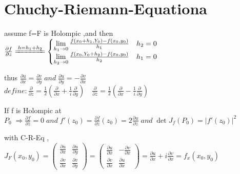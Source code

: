 \documentclass[12pt, a4paper, oneside]{ctexart}
\begin{document}
\section*{Chuchy-Riemann-Equationa}
assume f=F is Holompic ,and then $\frac{\partial{f}}{\partial{z}}\xlongequal{h=h_1+h_2}
\begin{cases}
    \lim\limits_{h_1\to 0}\frac{f(x_0+h_1,Y_0)-f(x_0,y_0)}{h_1}&h_2=0\\
    \lim\limits_{h_2\to 0}\frac{f(x_0,Y_0+h_2)-f(x_0,y_0)}{h_2}&h_1=0    
\end{cases}$\\
\begin{center}  
thus $\frac{\partial{u}}{\partial{x}}=\frac{\partial{v}}{\partial{y}}\;and\;
    \frac{\partial{u}}{\partial{y}}=-\frac{\partial{v}}{\partial{x}}$\\
    $define:\frac{\partial}{\partial{z}}=\frac{1}{2}(\frac{\partial}{\partial{x}}+\frac{1}{i}\frac{\partial}{\partial{y}})
    \quad\frac{\partial}{\partial{\overline{z}}}=\frac{1}{2}(\frac{\partial}{\partial{x}}-\frac{1}{i}\frac{\partial}{\partial{y}})$
\end{center}
\begin{center}
    If f is Holompic at $P_0\;\Rightarrow \frac{\partial{f}}{\partial{\overline{z}}}=0\;and\;f'(z_0)=\frac{\partial{f}}{\partial{z}}(z_0)=
    2\frac{\partial{u}}{\partial{z}}\;and\;\det{J_f(P_0)}=|f'(z_0)|^2$
\end{center}
\begin{center}
    with C-R-Eq , $J_F(x_0,y_0)=\left(\begin{matrix}
        \frac{\partial{u}}{\partial{x}}
        &\frac{\partial{u}}{\partial{y}}\\\frac{\partial{v}}{\partial{x}}&\frac{\partial{v}}{\partial{y}}
    \end{matrix}\right)
    =
    \left(\begin{matrix}
        \frac{\partial{u}}{\partial{x}}
        &-\frac{\partial{v}}{\partial{x}}\\\frac{\partial{v}}{\partial{x}}&\frac{\partial{u}}{\partial{x}}
    \end{matrix}\right)
    =\frac{\partial{u}}{\partial{x}}+i\frac{\partial{v}}{\partial{x}}=f_x(x_0,y_0)$
\end{center}
\end{document}
